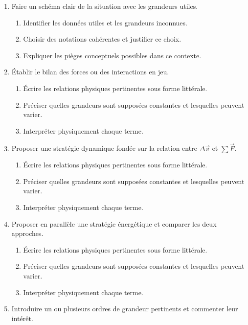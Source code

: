\documentclass[11pt,a4paper]{article}
\begin{document}
\begin{enumerate}[label=\textbf{Très long \arabic*.},leftmargin=*]
\begin{enumerate}[label=\textbf{\arabic*)}]
\begin{enumerate}[label=\alph*)]
\item Choisir des notations cohérentes et justifier ce choix.
\item Expliquer les pièges conceptuels possibles dans ce contexte.
\end{enumerate}
\item Faire un schéma clair de la situation avec les grandeurs utiles.
\begin{enumerate}[label=\alph*)]
\item Identifier les données utiles et les grandeurs inconnues.
\item Choisir des notations cohérentes et justifier ce choix.
\item Expliquer les pièges conceptuels possibles dans ce contexte.
\end{enumerate}
\item Établir le bilan des forces ou des interactions en jeu.
\begin{enumerate}[label=\alph*)]
\item Écrire les relations physiques pertinentes sous forme littérale.
\item Préciser quelles grandeurs sont supposées constantes et lesquelles peuvent varier.
\item Interpréter physiquement chaque terme.
\end{enumerate}
\item Proposer une stratégie dynamique fondée sur la relation entre $\Delta\vec v$ et $\sum\vec F$.
\begin{enumerate}[label=\alph*)]
\item Écrire les relations physiques pertinentes sous forme littérale.
\item Préciser quelles grandeurs sont supposées constantes et lesquelles peuvent varier.
\item Interpréter physiquement chaque terme.
\end{enumerate}
\item Proposer en parallèle une stratégie énergétique et comparer les deux approches.
\begin{enumerate}[label=\alph*)]
\item Écrire les relations physiques pertinentes sous forme littérale.
\item Préciser quelles grandeurs sont supposées constantes et lesquelles peuvent varier.
\item Interpréter physiquement chaque terme.
\end{enumerate}
\item Introduire un ou plusieurs ordres de grandeur pertinents et commenter leur intérêt.

\end{enumerate}
\end{enumerate}
\end{document}
